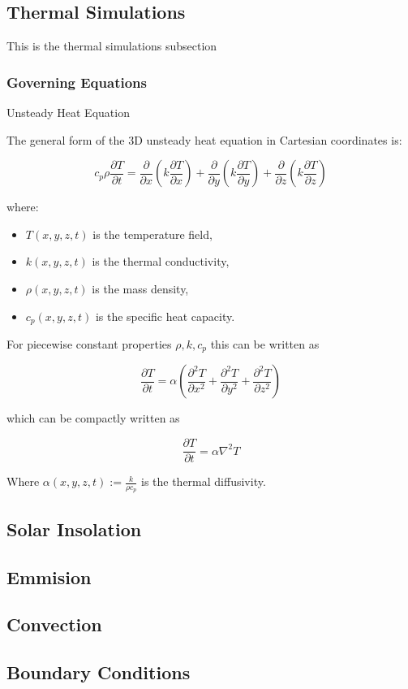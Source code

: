 \subsection{Thermal Simulations}

This is the thermal simulations subsection

\subsubsection{Governing Equations}
Unsteady Heat Equation

The general form of the 3D unsteady heat equation in Cartesian coordinates is:

\begin{equation}
    c_p \rho \frac{\partial T}{\partial t} = 
    \frac{\partial}{\partial x} \left( k \frac{\partial T}{\partial x} \right) + 
    \frac{\partial}{\partial y} \left( k \frac{\partial T}{\partial y} \right) + 
    \frac{\partial}{\partial z} \left( k \frac{\partial T}{\partial z} \right)
\end{equation}


where:
\begin{itemize}
    \item \( T(x,y,z,t) \) is the temperature field,
    \item \( k(x,y,z,t) \) is the thermal conductivity,
    \item \( \rho(x,y,z,t) \) is the mass density,
    \item \( c_p (x,y,z,t) \) is the specific heat capacity.
    
\end{itemize}

For piecewise constant properties $\rho, k, c_p$ this can be written as

\begin{equation}
    \frac{\partial T}{\partial t} = \alpha \left( \frac{\partial^2 T}{\partial x^2} + \frac{\partial^2 T}{\partial y^2} + \frac{\partial^2 T}{\partial z^2} \right)
\end{equation}

which can be compactly written as

\begin{equation}
    \frac{\partial T}{\partial t} = \alpha \nabla^2 T
\end{equation}



Where \( \alpha(x,y,z,t) := \frac{k}{\rho c_p}\) is the thermal diffusivity.


\subsection{Solar Insolation}
\subsection{Emmision}
\subsection{Convection}

\subsection{Boundary Conditions}